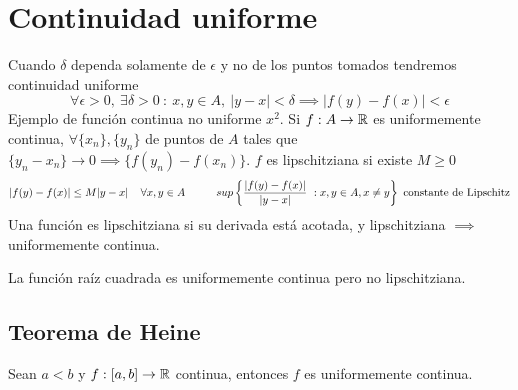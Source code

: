 \section{Continuidad uniforme}
Cuando $\delta$ dependa solamente de $\epsilon$ y no de los puntos tomados tendremos continuidad uniforme
$$ \forall\epsilon>0,\ \exists\delta>0\ : \ x,y\in A, \ |y-x|<\delta \implies |f(y)-f(x)|<\epsilon $$
Ejemplo de función continua no uniforme $x^2$. Si $f:A\rightarrow\mathbb{R}$ es uniformemente continua, $\forall \{x_n\},\{y_n\}$ de puntos de $A$ tales que $\{y_n-x_n\}\rightarrow0 \implies \{f(y_n)-f(x_n)\}$. $f$ es lipschitziana si existe $M\geq 0$
$$ |f(y)-f(x)|\leq M|y-x| \hspace{0.4cm} \forall x,y\in A\hspace{1cm} 
sup\left\{\frac{|f(y)-f(x)|}{|y-x|} \ :  x,y\in A,  x\not = y \right\} \text{ constante de Lipschitz}$$
Una función es lipschitziana si su derivada está acotada, y lipschitziana $\implies$ uniformemente continua.

La función raíz cuadrada es uniformemente continua pero no lipschitziana.

\subsection{Teorema de Heine}
Sean $a<b$ y $f:[a,b]\rightarrow\mathbb{R}$ continua, entonces $f$ es uniformemente continua.
